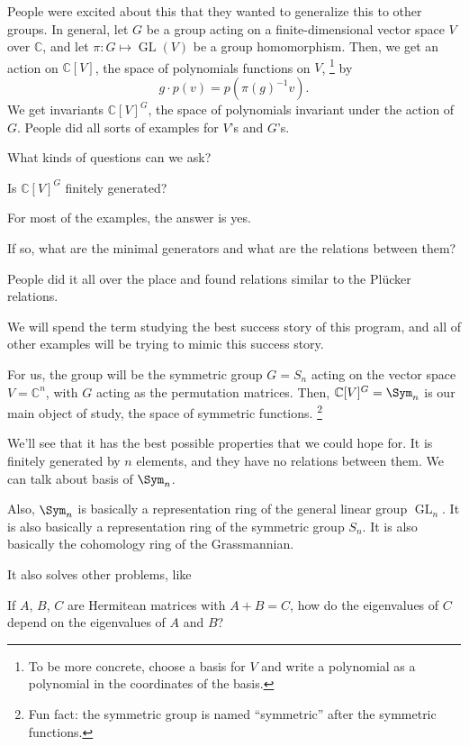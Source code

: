 People were excited about this that they wanted to generalize this to other groups.
In general, let \(G\) be a group acting on a finite-dimensional vector space \(V\) over \(\mathbb{C}\), and let \(\pi \colon G \mapsto \operatorname{GL}(V)\) be a group homomorphism.
Then, we get an action on \(\mathbb{C}[V]\), the space of polynomials functions on \(V\),%
\footnote{To be more concrete, choose a basis for \(V\) and write a polynomial as a polynomial in the coordinates of the basis.}
by 
\begin{equation*}
    g \cdot p(v) = p(\pi(g)^{-1}v).
\end{equation*}
We get invariants \(\mathbb{C}[V]^G\), the space of polynomials invariant under the action of \(G\).
People did all sorts of examples for \(V\)'s and \(G\)'s.

What kinds of questions can we ask?

\begin{question}
    Is \(\mathbb{C}[V]^G\) finitely generated?
\end{question}

For most of the examples, the answer is yes.

\begin{question}
    If so, what are the minimal generators and what are the relations between them?
\end{question}

People did it all over the place and found relations similar to the Plücker relations.

We will spend the term studying the best success story of this program,
and all of other examples will be trying to mimic this success story.

For us, the group will be the symmetric group \(G = S_n\) acting on the vector space \(V = \mathbb{C}^n\), with \(G\) acting as the permutation matrices.
Then, \(\mathbb{C}[V]^G = \Sym_n\) is our main object of study, the space of symmetric functions.%
\footnote{Fun fact: the symmetric group is named ``symmetric'' after the symmetric functions.}

We'll see that it has the best possible properties that we could hope for.
It is finitely generated by \(n\) elements, and they have no relations between them.
We can talk about basis of \(\Sym_n\).

Also, \(\Sym_n\) is basically a representation ring of the general linear group \(\operatorname{GL}_n\).
It is also basically a representation ring of the symmetric group \(S_n\).
It is also basically the cohomology ring of the Grassmannian.

It also solves other problems, like
\begin{question}
    If \(A\), \(B\), \(C\) are Hermitean matrices
    with \(A + B = C\),
    how do the eigenvalues of \(C\) depend on the eigenvalues of \(A\) and \(B\)?
\end{question}